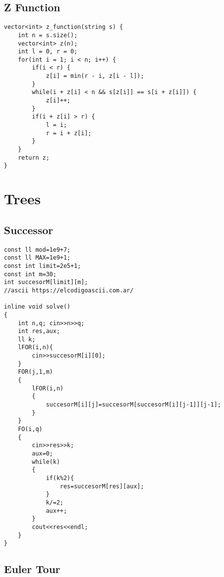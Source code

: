 \documentclass{article}
\begin{document}
\subsection{Z Function}

\begin{lstlisting}
vector<int> z_function(string s) {
    int n = s.size();
    vector<int> z(n);
    int l = 0, r = 0;
    for(int i = 1; i < n; i++) {
        if(i < r) {
            z[i] = min(r - i, z[i - l]);
        }
        while(i + z[i] < n && s[z[i]] == s[i + z[i]]) {
            z[i]++;
        }
        if(i + z[i] > r) {
            l = i;
            r = i + z[i];
        }
    }
    return z;
}
\end{lstlisting}

\section{Trees}

\subsection{Successor}
\begin{lstlisting}
const ll mod=1e9+7;
const ll MAX=1e9+1;
const int limit=2e5+1;
const int m=30;
int succesorM[limit][m];
//ascii https://elcodigoascii.com.ar/

inline void solve()
{
    int n,q; cin>>n>>q;
    int res,aux;
    ll k;
    lFOR(i,n){
        cin>>succesorM[i][0];
    }
    FOR(j,1,m)
    {
        lFOR(i,n)
        {
            succesorM[i][j]=succesorM[succesorM[i][j-1]][j-1];
        }
    }
    FO(i,q)
    {
        cin>>res>>k;
        aux=0;
        while(k)
        {
            if(k%2){
                res=succesorM[res][aux];
            }
            k/=2;
            aux++;
        }
        cout<<res<<endl;
    }
}
\end{lstlisting}

\subsection{Euler Tour}
\end{document}
